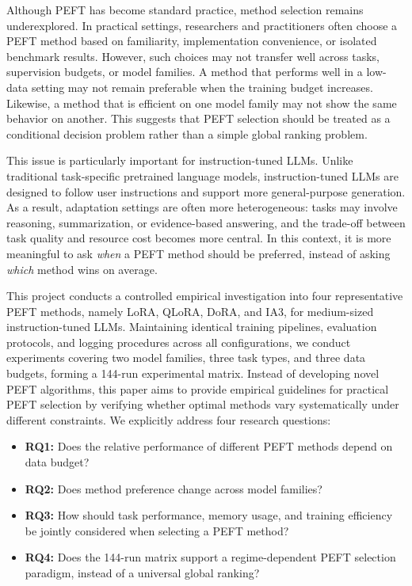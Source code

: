 \documentclass{article}
\begin{document}
Although PEFT has become standard practice, method selection remains underexplored. In practical settings, researchers and practitioners often choose a PEFT method based on familiarity, implementation convenience, or isolated benchmark results. However, such choices may not transfer well across tasks, supervision budgets, or model families. A method that performs well in a low-data setting may not remain preferable when the training budget increases. Likewise, a method that is efficient on one model family may not show the same behavior on another. This suggests that PEFT selection should be treated as a conditional decision problem rather than a simple global ranking problem.

This issue is particularly important for instruction-tuned LLMs. Unlike traditional task-specific pretrained language models, instruction-tuned LLMs are designed to follow user instructions and support more general-purpose generation. As a result, adaptation settings are often more heterogeneous: tasks may involve reasoning, summarization, or evidence-based answering, and the trade-off between task quality and resource cost becomes more central. In this context, it is more meaningful to ask \emph{when} a PEFT method should be preferred, instead of asking \emph{which} method wins on average.

This project conducts a controlled empirical investigation into four representative PEFT methods, namely LoRA, QLoRA, DoRA, and IA3, for medium-sized instruction-tuned LLMs. Maintaining identical training pipelines, evaluation protocols, and logging procedures across all configurations, we conduct experiments covering two model families, three task types, and three data budgets, forming a 144-run experimental matrix. Instead of developing novel PEFT algorithms, this paper aims to provide empirical guidelines for practical PEFT selection by verifying whether optimal methods vary systematically under different constraints. We explicitly address four research questions:\begin{itemize}\item \textbf{RQ1:} Does the relative performance of different PEFT methods depend on data budget?\item \textbf{RQ2:} Does method preference change across model families?\item \textbf{RQ3:} How should task performance, memory usage, and training efficiency be jointly considered when selecting a PEFT method?\item \textbf{RQ4:} Does the 144-run matrix support a regime-dependent PEFT selection paradigm, instead of a universal global ranking?\end{itemize}
\end{document}
